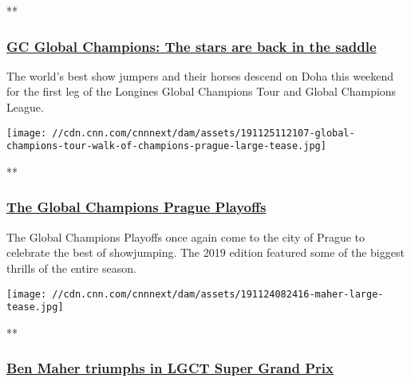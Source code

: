 **

\hypertarget{gc-global-champions-the-stars-are-back-in-the-saddle}{%
\subsubsection{\texorpdfstring{\href{/videos/sports/2020/03/02/doha-cnneq-spt-intl.cnn}{GC
Global Champions: The stars are back in the
saddle}}{GC Global Champions: The stars are back in the saddle}}\label{gc-global-champions-the-stars-are-back-in-the-saddle}}

The world's best show jumpers and their horses descend on Doha this
weekend for the first leg of the Longines Global Champions Tour and
Global Champions League.

\href{/videos/sports/2019/12/02/longines-global-champions-tour-gcl-prague-playoffs-cnneq-vision-spt-intl.cnn}{}

\texttt{[image: //cdn.cnn.com/cnnnext/dam/assets/191125112107-global-champions-tour-walk-of-champions-prague-large-tease.jpg]}

**

\hypertarget{the-global-champions-prague-playoffs-}{%
\subsubsection{\texorpdfstring{\href{/videos/sports/2019/12/02/longines-global-champions-tour-gcl-prague-playoffs-cnneq-vision-spt-intl.cnn}{The
Global Champions Prague Playoffs
}}{The Global Champions Prague Playoffs }}\label{the-global-champions-prague-playoffs-}}

The Global Champions Playoffs once again come to the city of Prague to
celebrate the best of showjumping. The 2019 edition featured some of the
biggest thrills of the entire season.

\href{/videos/sports/2019/11/25/ben-maher-explosion-w-lgct-super-grand-prix-prague-review-cnneq-vision-spt-intl.cnn}{}

\texttt{[image: //cdn.cnn.com/cnnnext/dam/assets/191124082416-maher-large-tease.jpg]}

**

\hypertarget{ben-maher-triumphs-in-lgct-super-grand-prix}{%
\subsubsection{\texorpdfstring{\href{/videos/sports/2019/11/25/ben-maher-explosion-w-lgct-super-grand-prix-prague-review-cnneq-vision-spt-intl.cnn}{Ben
Maher triumphs in LGCT Super Grand
Prix}}{Ben Maher triumphs in LGCT Super Grand Prix}}\label{ben-maher-triumphs-in-lgct-super-grand-prix}}

